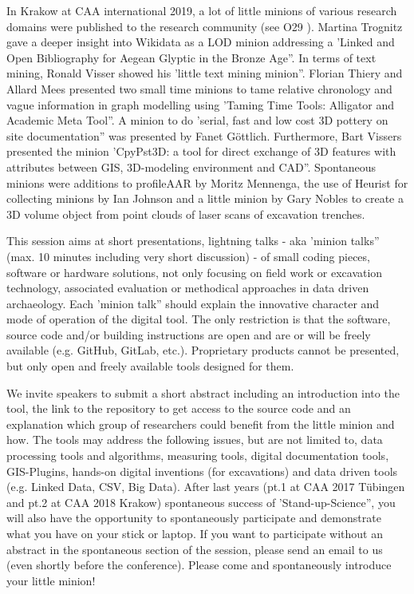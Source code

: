 \documentclass[a4paper]{article}
\begin{document}
In Krakow at CAA international 2019, a lot of little minions of various research domains were published to the research community (see O29 \cite{boa_caa_2019}). Martina Trognitz gave a deeper insight into Wikidata as a LOD minion addressing a 'Linked and Open Bibliography for Aegean Glyptic in the Bronze Age”. In terms of text mining, Ronald Visser showed his 'little text mining minion”. Florian Thiery and Allard Mees presented two small time minions to tame relative chronology and vague information in graph modelling using 'Taming Time Tools: Alligator and Academic Meta Tool”. A minion to do 'serial, fast and low cost 3D pottery on site documentation” was presented by Fanet Göttlich. Furthermore, Bart Vissers presented the minion 'CpyPst3D: a tool for direct exchange of 3D features with attributes between GIS, 3D-modeling environment and CAD”. Spontaneous minions were additions to profileAAR by Moritz Mennenga, the use of Heurist for collecting minions by Ian Johnson and a little minion by Gary Nobles to create a 3D volume object from point clouds of laser scans of excavation trenches.

This session aims at short presentations, lightning talks - aka 'minion talks” (max. 10 minutes including very short discussion) - of small coding pieces, software or hardware solutions, not only focusing on field work or excavation technology, associated evaluation or methodical approaches in data driven archaeology. Each 'minion talk” should explain the innovative character and mode of operation of the digital tool. The only restriction is that the software, source code and/or building instructions are open and are or will be freely available (e.g. GitHub, GitLab, etc.). Proprietary products cannot be presented, but only open and freely available tools designed for them.

We invite speakers to submit a short abstract including an introduction into the tool, the link to the repository to get access to the source code and an explanation which group of researchers could benefit from the little minion and how. The tools may address the following issues, but are not limited to, data processing tools and algorithms, measuring tools, digital documentation tools, GIS-Plugins, hands-on digital inventions (for excavations) and data driven tools (e.g. Linked Data, CSV, Big Data). After last years (pt.1 at CAA 2017 T{\"u}bingen and pt.2 at CAA 2018 Krakow) spontaneous success of 'Stand-up-Science”, you will also have the opportunity to spontaneously participate and demonstrate what you have on your stick or laptop. If you want to participate without an abstract in the spontaneous section of the session, please send an email to us (even shortly before the conference). Please come and spontaneously introduce your little minion!
\end{document}
